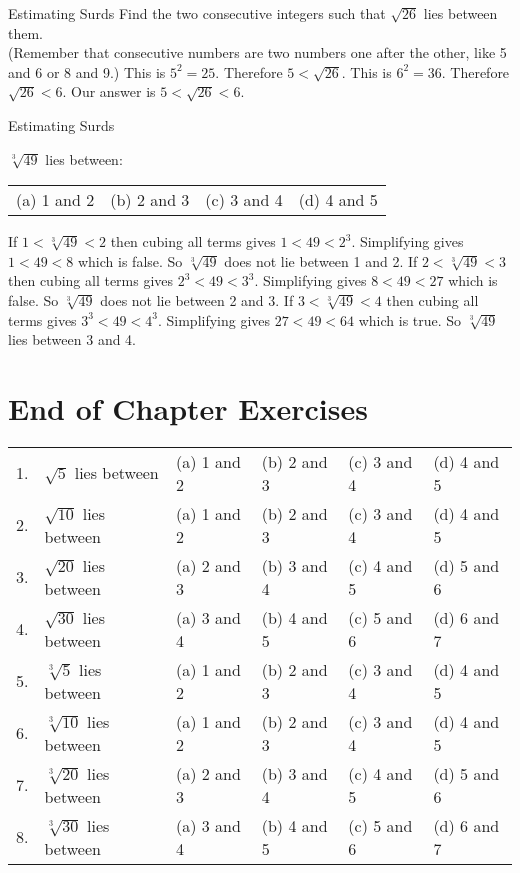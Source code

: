 \documentclass[10pt,a4paper,titlepage,twoside,openright]{report}
\begin{document}
\begin{wex}{Estimating Surds}
{Find the two consecutive integers such that $\sqrt{26}$ lies between them.\\(Remember that consecutive numbers are two numbers one after the other, like 5 and 6 or 8 and 9.)}{
 This is $5^2 = 25$. Therefore $5 < \sqrt{26}$. 
 This is $6^2 = 36$. Therefore $\sqrt{26} < 6$. 
 Our answer is $5 < \sqrt{26} < 6$.}
\end{wex}

\begin{wex}{Estimating Surds}
{$\sqrt[3]{49}$ lies between:
\begin{tabular}{llll}
(a) 1 and 2 &  (b) 2 and 3 &  (c) 3 and 4 &  (d) 4 and 5\\
\end{tabular}}{
 If $1 < \sqrt[3]{49} < 2$ then cubing all terms gives $1 < 49 < 2^3$. Simplifying gives $1 < 49 < 8$ which is false. So $\sqrt[3]{49}$ does not lie between 1 and 2.
 If $2 < \sqrt[3]{49} < 3$ then cubing all terms gives $2^3 < 49 < 3^3$. Simplifying gives $8 < 49 < 27$ which is false. So $\sqrt[3]{49}$ does not lie between 2 and 3. 
 If $3 < \sqrt[3]{49} < 4$ then cubing all terms gives $3^3 < 49 < 4^3$. Simplifying gives $27 < 49 < 64$ which is true. So $\sqrt[3]{49}$ lies between 3 and 4. 
}
\end{wex}

\section{End of Chapter Exercises}
\begin{tabular}{clllll}
1. & $\sqrt{5}$ lies between &
(a) 1 and 2 &  (b) 2 and 3 &  (c) 3 and 4 &  (d) 4 and 5\\
2. & $\sqrt{10}$ lies between &
(a) 1 and 2 & (b) 2 and 3 & (c) 3 and 4 & (d) 4 and 5\\
3. & $\sqrt{20}$ lies between&
(a) 2 and 3 & (b) 3 and 4 & (c) 4 and 5 &	(d) 5 and 6\\
4. & $\sqrt{30}$ lies between &
(a) 3 and 4 &(b) 4 and 5 & (c) 5 and 6 & (d) 6 and 7\\
5. & $\sqrt[3]{5}$ lies between &
(a) 1 and 2 &  (b) 2 and 3 &  (c) 3 and 4 &  (d) 4 and 5\\
6. & $\sqrt[3]{10}$ lies between &
(a) 1 and 2 &(b) 2 and 3 & (c) 3 and 4 & (d) 4 and 5\\
7. & $\sqrt[3]{20}$ lies between &
(a) 2 and 3 &(b) 3 and 4 &(c) 4 and 5 & (d) 5 and 6\\
8. & $\sqrt[3]{30}$ lies between &
(a) 3 and 4 &(b) 4 and 5 & (c) 5 and 6 &(d) 6 and 7
\end{tabular}
\end{document}
